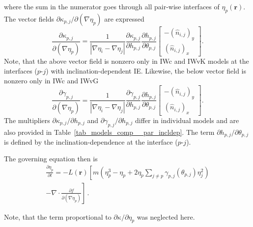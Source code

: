 where the sum in the numerator goes through all pair-wise interfaces of $\eta_p(\bm{r})$. The vector fields $\partial\kappa_{p,j}/\partial (\nabla\eta_p)$ are expressed
\begin{equation} \label{eq_dkppijdGp}
	\frac{\partial \kappa_{p,j}}{\partial (\nabla\eta_p)} = \frac{1}{|\nabla\eta_i-\nabla\eta_j|}\frac{\partial \kappa_{p,j}}{\partial h_{p,j}}\frac{\partial h_{p,j}}{\partial \theta_{p,j}} \left[\begin{array}{c}
		-(\hat{n}_{i,j})_y   \\
		(\hat{n}_{i,j})_x
	\end{array} \right].
\end{equation}
Note, that the above vector field is nonzero only in IWc and IWvK models at the interfaces ($p$-$j$) with inclination-dependent IE. Likewise, the below vector field is nonzero only in IWc and IWvG
\begin{equation} \label{eq_dgmmijdGp}
	\frac{\partial \gamma_{p,j}}{\partial (\nabla\eta_p)} = \frac{1}{|\nabla\eta_i-\nabla\eta_j|}\frac{\partial \gamma_{p,j}}{\partial h_{p,j}}\frac{\partial h_{p,j}}{\partial \theta_{p,j}} \left[\begin{array}{c}
		-(\hat{n}_{i,j})_y   \\
		(\hat{n}_{i,j})_x
	\end{array} \right].
\end{equation}
The multipliers $\partial \kappa_{p,j}/\partial h_{p,j}$ and $\partial \gamma_{p,j}/\partial h_{p,j}$ differ in individual models and are also provided in Table~\ref{tab_models_comp__par_incldep}. The term $\partial h_{p,j}/\partial \theta_{p,j}$ is defined by the inclination-dependence at the interface ($p$-$j$).

The governing equation then is
\begin{equation}
	\begin{split}
		\frac{\partial \eta_p}{\partial t} = -L(\bm{r})\left[ m\left( \eta_p^3-\eta_p +  2\eta_p\sum_{j\neq p}\gamma_{p,j}(\theta_{p,j})\eta_j^2 \right) \right. \\ 
		\left.  -\nabla\cdot \frac{\partial f}{\partial(\nabla \eta_p)} \right] \,.
	\end{split}
\end{equation}

Note, that the term proportional to $\partial \kappa/\partial\eta_p$ was neglected here. 

